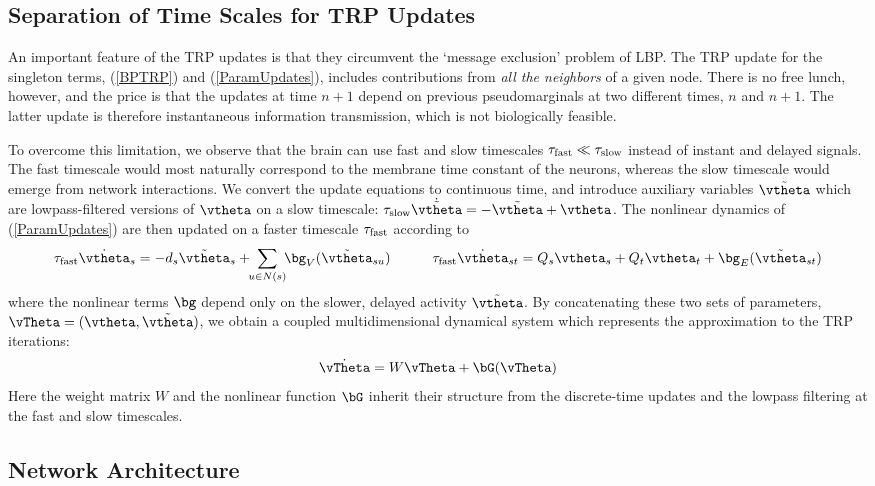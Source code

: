 \documentclass{article}
\begin{document}
\subsection{Separation of Time Scales for TRP Updates}


An important feature of the TRP updates is that they circumvent the `message exclusion' problem of LBP. The TRP update for the singleton terms, (\ref{BPTRP}) and (\ref{ParamUpdates}), includes contributions from \textit{all the neighbors} of a given node. There is no free lunch, however, and the price is that the updates at time $n+1$ depend on previous pseudomarginals at two different times, $n$ and $n+1$. The latter update is therefore instantaneous information transmission, which is not biologically feasible.

To overcome this limitation, we observe that the brain can use fast and slow timescales $\tau_{\rm fast} \ll \tau_{\rm slow}$ instead of instant and delayed signals. The fast timescale would most naturally correspond to the membrane time constant of the neurons, whereas the slow timescale would emerge from network interactions. We convert the update equations to continuous time, and introduce auxiliary variables $\tilde{\vtheta}$ which are lowpass-filtered versions of $\vtheta$ on a slow timescale: $\tau_{\rm slow} \dot{\tilde{\vtheta}} = -\tilde{\vtheta} + \vtheta$. The nonlinear dynamics of (\ref{ParamUpdates}) are then updated on a faster timescale $\tau_{\rm fast}$ according to
\begin{equation}
\label{ContinuousParamUpdates}
\tau_{\rm fast}\dot{\vtheta}_s = -d_s\tilde{\vtheta}_s +\!\! \sum_{u\in N(s)} \!\!\bg_V(\tilde{\vtheta}_{su})
\hspace{3em}
\tau_{\rm fast}\dot{\vtheta}_{st} = Q_s \vtheta_s + Q_t \vtheta_t + \bg_E(\tilde{\vtheta}_{st})
\end{equation}
where the nonlinear terms $\bg$ depend only on the slower, delayed activity $\tilde{\vtheta}$. By concatenating these two sets of parameters, $\vTheta = (\vtheta,\tilde{\vtheta})$, we obtain a coupled multidimensional dynamical system which represents the approximation to the TRP iterations:
\begin{equation}
\label{DSEq}
	\dot{\vTheta} = W\vTheta + \bG(\vTheta)
\end{equation}
Here the weight matrix $W$ and the nonlinear function $\bG$ inherit their structure from the discrete-time updates and the lowpass filtering at the fast and slow timescales.

\subsection{Network Architecture}
\label{NNet}
\end{document}
